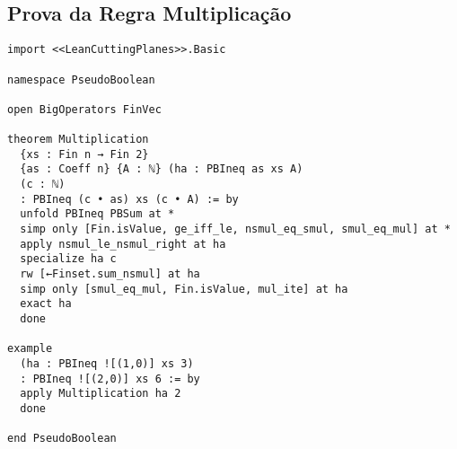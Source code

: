 \documentclass[conference]{IEEEtran}
\begin{document}
\subsection{Prova da Regra Multiplicação}
\begin{verbatim}
import <<LeanCuttingPlanes>>.Basic

namespace PseudoBoolean

open BigOperators FinVec

theorem Multiplication
  {xs : Fin n → Fin 2}
  {as : Coeff n} {A : ℕ} (ha : PBIneq as xs A)
  (c : ℕ)
  : PBIneq (c • as) xs (c • A) := by
  unfold PBIneq PBSum at *
  simp only [Fin.isValue, ge_iff_le, nsmul_eq_smul, smul_eq_mul] at *
  apply nsmul_le_nsmul_right at ha
  specialize ha c
  rw [←Finset.sum_nsmul] at ha
  simp only [smul_eq_mul, Fin.isValue, mul_ite] at ha
  exact ha
  done

example
  (ha : PBIneq ![(1,0)] xs 3)
  : PBIneq ![(2,0)] xs 6 := by
  apply Multiplication ha 2
  done

end PseudoBoolean
\end{verbatim}
\newpage
\end{document}

